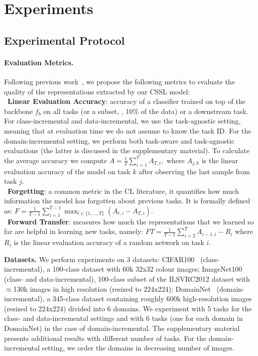 \vspace{-5pt}
\section{Experiments}
\label{sec:experiments}
\vspace{-5pt}
\subsection{Experimental Protocol}
\label{sec:protocol}
\vspace{-5pt}
\paragraph{Evaluation Metrics.}
Following previous work~\cite{Lopez-Paz17}, we propose the following metrics to evaluate the quality of the representations extracted by our CSSL model:\\
\mybullet\ \textbf{Linear Evaluation Accuracy}: accuracy of a classifier trained on top of the backbone $f_b$ on all tasks (or a subset, \eg, 10\% of the data) or a downstream task. For class-incremental and data-incremental, we use the task-agnostic setting, meaning that at evaluation time we do not assume to know the task ID. For the domain-incremental setting, we perform both task-aware and task-agnostic evaluations (the latter is discussed in the supplementary material). To calculate the average accuracy we compute $A = \frac{1}{T} \sum_{i=1}^{T} A_{T, i},$ where $A_{j,k}$ is the linear evaluation accuracy of the model on task $k$ after observing the last sample from task $j$.\\
\mybullet\ \textbf{Forgetting}: a common metric in the CL literature, it quantifies how much information the model has forgotten about previous tasks. It is formally defined as: $F=\frac{1}{T-1} \sum_{i=1}^{T-1} \max _{t \in\{1, \ldots, T\}}\left(A_{t, i}-A_{T, i}\right)$.\vspace{1mm}\\
\mybullet\ \textbf{Forward Transfer}: measures how much the representations that we learned so far are helpful in learning new tasks, namely: $FT = \frac{1}{T-1} \sum_{i=2}^{T} A_{i-1, i}-R_{i}$ where $R_{i}$ is the linear evaluation accuracy of a random network on task $i$.

\noindent\textbf{Datasets.} We perform experiments on 3 datasets: {CIFAR100}~\cite{krizhevsky2009learning} (class-incremental), a 100-class dataset with 60k 32x32 colour images; {ImageNet100}~\cite{tian2020contrastive} (class- and data-incremental), 100-class subset of the ILSVRC2012 dataset with $\approx$130k images in high resolution (resized to 224x224); {DomainNet}~\cite{peng2019moment} (domain-incremental), a 345-class dataset containing roughly 600k high-resolution images (resized to 224x224) divided into 6 domains. We experiment with 5 tasks for the class- and data-incremental settings and with 6 tasks (one for each domain in DomainNet) in the case of domain-incremental. The supplementary material presents additional results with different number of tasks. For the domain-incremental setting, we order the domains in decreasing number of images.

